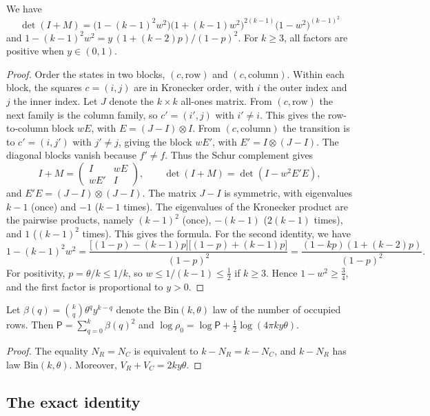 \begin{lema}\label{lem:torres-lazo}
We have
\[
 \det(I+M)=\bigl(1-(k-1)^2w^2\bigr)\bigl(1+(k-1)w^2\bigr)^{2(k-1)}\bigl(1-w^2\bigr)^{(k-1)^2}
\]
and $1-(k-1)^2w^2=y\,(1+(k-2)p)/(1-p)^2$. For $k\ge3$, all factors are positive when
$y\in(0,1)$.
\end{lema}
\begin{proof}
Order the states in two blocks, $(c,\text{row})$ and $(c,\text{column})$. Within each block,
the squares $c=(i,j)$ are in Kronecker order, with $i$ the outer index and $j$ the inner index. Let $J$
denote the
$k\times k$ all-ones matrix. From $(c,\text{row})$ the next family is the column family, so $c'=(i',j)$ with
$i'\ne i$. This gives the row-to-column block $wE$, with $E=(J-I)\otimes I$. From
$(c,\text{column})$ the transition is to $c'=(i,j')$ with $j'\ne j$, giving the block $wE'$, with
$E'=I\otimes(J-I)$. The diagonal blocks vanish because $f'\ne f$. Thus the Schur complement gives
\[
 I+M=\begin{pmatrix}I&wE\\ wE'&I\end{pmatrix},\qquad \det(I+M)=\det(I-w^2E'E),
\]
and $E'E=(J-I)\otimes(J-I)$. The matrix $J-I$ is symmetric, with eigenvalues $k-1$ (once) and $-1$ ($k-1$
times). The eigenvalues of the Kronecker product are the pairwise products, namely $(k-1)^2$ (once),
$-(k-1)$
($2(k-1)$ times), and $1$ ($(k-1)^2$ times). This gives the formula. For the second identity, we have
\[
 1-(k-1)^2w^2=\frac{\bigl[(1-p)-(k-1)p\bigr]\bigl[(1-p)+(k-1)p\bigr]}{(1-p)^2}
 =\frac{(1-kp)(1+(k-2)p)}{(1-p)^2}.
\]
For positivity, $p=\theta/k\le1/k$, so $w\le1/(k-1)\le\frac12$ if $k\ge3$. Hence
$1-w^2\ge\frac34$, and the first factor is proportional to $y>0$.
\end{proof}

\begin{lema}\label{lem:torres-cero}
Let $\beta(q)=\binom kq\theta^qy^{k-q}$ denote the $\mathrm{Bin}(k,\theta)$ law of the number of occupied
rows.
Then $\mathsf P=\sum_{q=0}^k\beta(q)^2$ and $\log\rho_0=\log\mathsf P+\frac12\log(4\pi ky\theta)$.
\end{lema}
\begin{proof}
The equality $N_R=N_C$ is equivalent to $k-N_R=k-N_C$, and $k-N_R$ has law $\mathrm{Bin}(k,\theta)$.
Moreover,
$V_R+V_C=2ky\theta$.
\end{proof}

\subsection{The exact identity}

